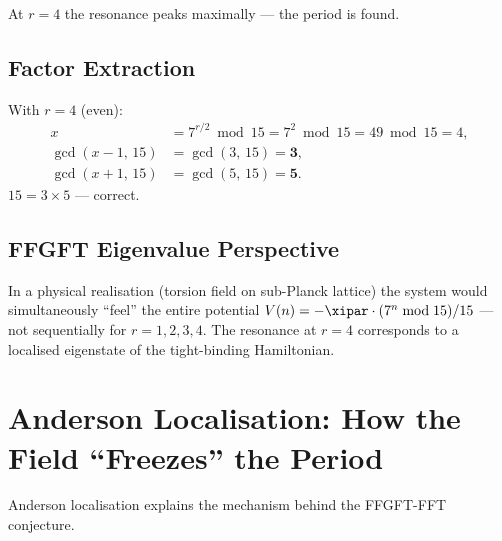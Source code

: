 \begin{center}
{\footnotesize
{}
} %
\end{center}

At $r = 4$ the resonance peaks maximally ---
the period is found.

\subsection{Factor Extraction}

With $r = 4$ (even):
\begin{align}
  x &= 7^{r/2} \bmod 15 = 7^2 \bmod 15 = 49 \bmod 15 = 4, \\
  \gcd(x-1,\,15) &= \gcd(3,\,15) = \mathbf{3}, \\
  \gcd(x+1,\,15) &= \gcd(5,\,15) = \mathbf{5}.
\end{align}
$15 = 3 \times 5$ --- correct.

\subsection{FFGFT Eigenvalue Perspective}

In a physical realisation
(torsion field on sub-Planck lattice)
the system would simultaneously ``feel'' the entire potential
$V(n) = -\xipar \cdot (7^n \bmod 15)/15$ ---
not sequentially for $r = 1, 2, 3, 4$.
The resonance at $r = 4$ corresponds to a
localised eigenstate of the
tight-binding Hamiltonian.

\section{Anderson Localisation: How the Field ``Freezes'' the Period}
\label{sec:anderson-detail}

Anderson localisation explains the mechanism
behind the FFGFT-FFT conjecture.

